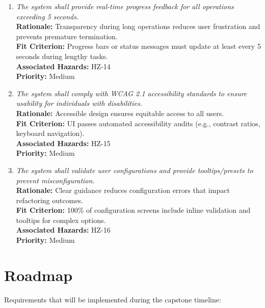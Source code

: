 \documentclass{article}
\begin{document}
\begin{enumerate}[label=SCR \arabic*., wide=0pt, leftmargin=*]
    \item \emph{The system shall provide real-time progress feedback for all operations exceeding 5 seconds.}\\
    {\bf Rationale:} Transparency during long operations reduces user frustration and prevents premature termination.\\
    {\bf Fit Criterion:} Progress bars or status messages must update at least every 5 seconds during lengthy tasks.\\
    {\bf Associated Hazards:} HZ-14\\
    {\bf Priority:} Medium

    \item \emph{The system shall comply with WCAG 2.1 accessibility standards to ensure usability for individuals with disabilities.}\\
    {\bf Rationale:} Accessible design ensures equitable access to all users.\\
    {\bf Fit Criterion:} UI passes automated accessibility audits (e.g., contrast ratios, keyboard navigation).\\
    {\bf Associated Hazards:} HZ-15\\
    {\bf Priority:} Medium

    \item \emph{The system shall validate user configurations and provide tooltips/presets to prevent misconfiguration.}\\
    {\bf Rationale:} Clear guidance reduces configuration errors that impact refactoring outcomes.\\
    {\bf Fit Criterion:} 100\% of configuration screens include inline validation and tooltips for complex options.\\
    {\bf Associated Hazards:} HZ-16\\
    {\bf Priority:} Medium

\end{enumerate}

\section{Roadmap}

Requirements that will be implemented during the capstone timeline:
\end{document}
